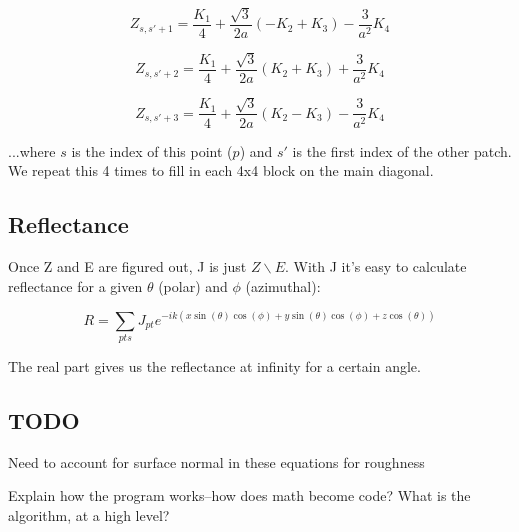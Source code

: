 \documentclass[etd,oneside,senior]{BYUPhys}
\begin{document}
\begin{equation}
  Z_{s,s'+1}=\frac{K_{1}}{4}+\frac{\sqrt{3}}{2a}\left(-K_{2}+K_{3}\right)-\frac{3}{a^{2}}K_{4}
\end{equation}

\begin{equation}
  Z_{s,s'+2}=\frac{K_{1}}{4}+\frac{\sqrt{3}}{2a}\left(K_{2}+K_{3}\right)+\frac{3}{a^{2}}K_{4}
\end{equation}

\begin{equation}
  Z_{s,s'+3}=\frac{K_{1}}{4}+\frac{\sqrt{3}}{2a}\left(K_{2}-K_{3}\right)-\frac{3}{a^{2}}K_{4}
\end{equation}

...where $s$ is the index of this point ($p$) and $s'$ is the first
index of the other patch. We repeat this 4 times to fill in each 4x4
block on the main diagonal.



\subsection{Reflectance}
Once Z and E are figured out, J is just $Z\backslash E$. With J it's easy to calculate reflectance for a given $\theta$ (polar) and $\phi$ (azimuthal):

\begin{equation}
  R=\sum_{pts}J_{pt}e^{-ik\left(x\sin\left(\theta\right)\cos\left(\phi\right)+y\sin\left(\theta\right)\cos\left(\phi\right)+z\cos\left(\theta\right)\right)}
\end{equation}

The real part gives us the reflectance at infinity for a certain angle.



\subsection{TODO}
Need to account for surface normal in these equations for roughness

Explain how the program works--how does math become code? What is the algorithm, at a high level?







\end{document}
